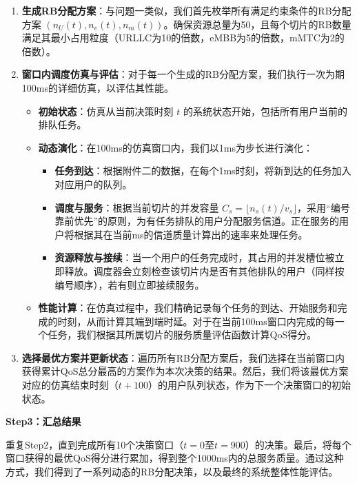 \begin{enumerate}
    \item \textbf{生成RB分配方案}：与问题一类似，我们首先枚举所有满足约束条件的RB分配方案 $(n_U(t), n_e(t), n_m(t))$。确保资源总量为50，且每个切片的RB数量满足其最小占用粒度（URLLC为10的倍数，eMBB为5的倍数，mMTC为2的倍数）。

    \item \textbf{窗口内调度仿真与评估}：对于每一个生成的RB分配方案，我们执行一次为期100ms的详细仿真，以评估其性能。
    \begin{itemize}
        \item \textbf{初始状态}：仿真从当前决策时刻 $t$ 的系统状态开始，包括所有用户当前的排队任务。
        \item \textbf{动态演化}：在100ms的仿真窗口内，我们以1ms为步长进行演化：
        \begin{itemize}
            \item \textbf{任务到达}：根据附件二的数据，在每个1ms时刻，将新到达的任务加入对应用户的队列。
            \item \textbf{调度与服务}：根据当前切片的并发容量 $C_s = \lfloor n_s(t) / v_s \rfloor$，采用“编号靠前优先”的原则，为有任务排队的用户分配服务信道。正在服务的用户将根据其在当前ms的信道质量计算出的速率来处理任务。
            \item \textbf{资源释放与接续}：当一个用户的任务完成时，其占用的并发槽位被立即释放。调度器会立刻检查该切片内是否有其他排队的用户（同样按编号顺序），若有则立即接续服务。
        \end{itemize}
        \item \textbf{性能计算}：在仿真过程中，我们精确记录每个任务的到达、开始服务和完成的时刻，从而计算其端到端时延。对于在当前100ms窗口内完成的每一个任务，我们根据其所属切片的服务质量评估函数计算QoS得分。
    \end{itemize}
    
    \item \textbf{选择最优方案并更新状态}：遍历所有RB分配方案后，我们选择在当前窗口内获得累计QoS总分最高的方案作为本次决策的结果。然后，我们将该最优方案对应的仿真结束时刻（$t+100$）的用户队列状态，作为下一个决策窗口的初始状态。
\end{enumerate}

\textbf{Step3：汇总结果}

重复Step2，直到完成所有10个决策窗口（$t=0$至$t=900$）的决策。最后，将每个窗口获得的最优QoS得分进行累加，得到整个1000ms内的总服务质量。通过这种方式，我们得到了一系列动态的RB分配决策，以及最终的系统整体性能评估。

